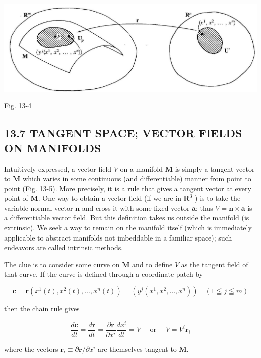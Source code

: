 \documentclass[10pt]{article}
\begin{document}
\begin{center}
\includegraphics[max width=\textwidth]{2024_04_03_41f90be4f896e21f0dc9g-206}
\end{center}

Fig. 13-4

\subsection*{13.7 TANGENT SPACE; VECTOR FIELDS ON MANIFOLDS}
Intuitively expressed, a vector field $V$ on a manifold $\mathbf{M}$ is simply a tangent vector to $\mathbf{M}$ which varies in some continuous (and differentiable) manner from point to point (Fig. 13-5). More precisely, it is a rule that gives a tangent vector at every point of $\mathbf{M}$. One way to obtain a vector field (if we are in $\mathbf{R}^{3}$ ) is to take the variable normal vector $\mathbf{n}$ and cross it with some fixed vector $\mathbf{a}$; thus $V=\mathbf{n} \times \mathbf{a}$ is a differentiable vector field. But this definition takes us outside the manifold (is extrinsic). We seek a way to remain on the manifold itself (which is immediately applicable to abstract manifolds not imbeddable in a familiar space); such endeavors are called intrinsic methods.

The clue is to consider some curve on $\mathbf{M}$ and to define $V$ as the tangent field of that curve. If the curve is defined through a coordinate patch by

$$
\mathbf{c}=\mathbf{r}\left(x^{1}(t), x^{2}(t), \ldots, x^{n}(t)\right)=\left(y^{j}\left(x^{1}, x^{2}, \ldots, x^{n}\right)\right) \quad(1 \leqq j \leqq m)
$$

then the chain rule gives

$$
\frac{d \mathbf{c}}{d t}=\frac{d \mathbf{r}}{d t}=\frac{\partial \mathbf{r}}{\partial x^{i}} \frac{d x^{i}}{d t}=V \quad \text { or } \quad V=V^{i} \mathbf{r}_{i}
$$

where the vectors $\mathbf{r}_{i} \equiv \partial \mathbf{r} / \partial x^{i}$ are themselves tangent to $\mathbf{M}$.
\end{document}
